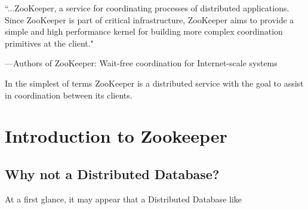 \epigraph{``...ZooKeeper, a service for coordinating processes of distributed applications. Since ZooKeeper is part of critical infrastructure, ZooKeeper aims to provide a simple and high performance kernel for building more complex coordination primitives at the client."}{---Authors of \textup{ZooKeeper: Wait-free coordination for Internet-scale systems}}

    In the simplest of terms ZooKeeper is a distributed service with the goal to assist in coordination between its clients.

\chapter{Introduction to Zookeeper}

\section{Why not a Distributed Database?}
At a first glance, it may appear that a Distributed Database like 
